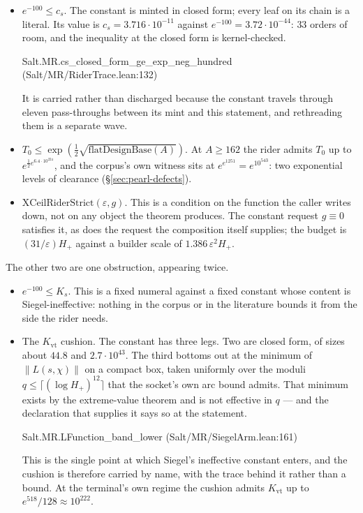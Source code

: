 \documentclass[11pt]{amsart}
\newcommand{\leanname}[1]{\par{\noindent\small\ttfamily\raggedright #1\par}}
\theoremstyle{remark}
\begin{document}
\begin{itemize}
\item $e^{-100} \le c_s$. The constant is minted in closed form; every leaf on
  its chain is a literal. Its value is $c_s = 3.716\cdot10^{-11}$ against
  $e^{-100} = 3.72\cdot10^{-44}$: $33$ orders of room, and the inequality at
  the closed form is kernel-checked.
  \leanname{Salt.MR.cs\_closed\_form\_ge\_exp\_neg\_hundred
  (Salt/MR/RiderTrace.lean:132)}
  It is carried rather than discharged because the constant travels through
  eleven pass-throughs between its mint and this statement, and rethreading
  them is a separate wave.
\item $T_0 \le \exp(\tfrac12\sqrt{\mathrm{flatDesignBase}(A)})$. At
  $A \ge 162$ the rider admits $T_0$ up to $e^{\frac12 e^{6.4\cdot10^{224}}}$,
  and the corpus's own witness sits at $e^{e^{1251}} = e^{10^{543}}$: two
  exponential levels of clearance (\S\ref{sec:pearl-defects}).
\item $\mathrm{XCeilRiderStrict}(\varepsilon, g)$. This is a condition on the
  function the caller writes down, not on any object the theorem produces. The
  constant request $g \equiv 0$ satisfies it, as does the request the
  composition itself supplies; the budget is $(31/\varepsilon)H_+$ against a
  builder scale of $1.386\,\varepsilon^{2}H_+$.
\end{itemize}

\noindent The other two are one obstruction, appearing twice.

\begin{itemize}
\item $e^{-100} \le K_s$. This is a fixed numeral against a fixed
  constant whose content is Siegel-ineffective: nothing in the corpus or in
  the literature bounds it from the side the rider needs.
\item The $K_{\mathrm{vt}}$ cushion. The constant has three legs. Two are
  closed form, of sizes about $44.8$ and $2.7\cdot10^{43}$. The third bottoms
  out at the minimum of $\|L(s,\chi)\|$ on a compact box, taken uniformly over
  the moduli $q \le \lceil(\log H_+)^{12}\rceil$ that the socket's own arc
  bound admits. That minimum exists by the extreme-value theorem and is not
  effective in $q$ --- and the declaration that supplies it says so at the
  statement.
  \leanname{Salt.MR.LFunction\_band\_lower (Salt/MR/SiegelArm.lean:161)}
  This is the single point at which Siegel's ineffective constant enters, and
  the cushion is therefore carried by name, with the trace behind it rather
  than a bound. At the terminal's own regime the cushion admits
  $K_{\mathrm{vt}}$ up to $e^{518}/128 \approx 10^{222}$.
\end{itemize}
\end{document}
